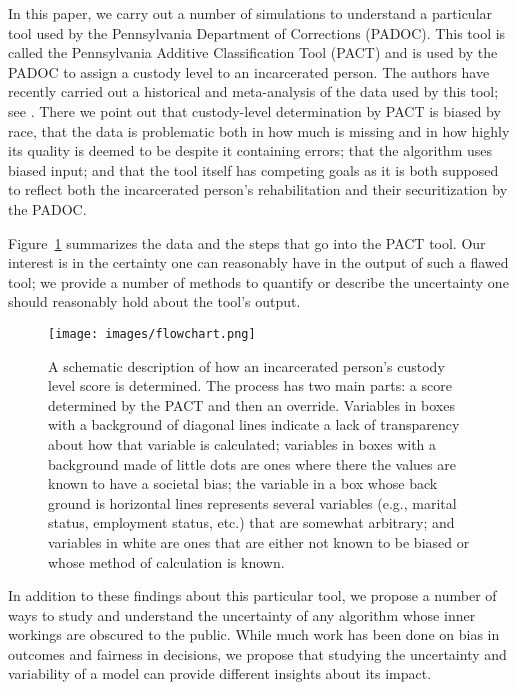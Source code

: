 \documentclass{amsproc}
\numberwithin{equation}{section}
\theoremstyle{plain}
\theoremstyle{remark}
\begin{document}
  
In this paper, we carry out a number of simulations to understand a particular tool used by the Pennsylvania Department of Corrections (PADOC).  This tool is called the Pennsylvania Additive Classification Tool (PACT) and is used by the PADOC to assign a custody level to an incarcerated person.  The authors have recently carried out a historical and meta-analysis of the data used by this tool; see \cite{dmmr1}.  There we point out that custody-level determination by PACT is biased by race, that the data is problematic both in how much is missing and in how highly its quality is deemed to be despite it containing errors; that the algorithm uses biased input;  and that the tool itself has competing goals as it is both supposed to reflect both the incarcerated person's rehabilitation and their securitization by the PADOC.  

 

Figure~\ref{fig:flowchart} summarizes the data and the steps that go into the PACT tool.  Our interest is in the certainty one can reasonably have in the output of such a flawed tool; we provide a number of methods to quantify or describe the uncertainty one should reasonably hold about the tool's output.  

\begin{figure}
\centering
\texttt{[image: images/flowchart.png]}
\caption{A schematic description of how an incarcerated person's custody level score is determined.  The process has two main parts:  a score determined by the PACT and then an override.  Variables in boxes with a background of diagonal lines indicate a lack of transparency about how that variable is calculated; variables in boxes with a background made of little dots are ones where there the values are known to have a societal bias; the variable in a box whose back ground is horizontal lines represents several variables (e.g., marital status, employment status, etc.) that are somewhat arbitrary; and variables in white are ones that are either not known to be biased or whose method of calculation is known. }\label{fig:flowchart}
\end{figure}


In addition to these findings about this particular tool, we propose a number of ways to study and understand the uncertainty of any algorithm whose inner workings are obscured to the public.  While much work has been done on bias in outcomes and fairness in decisions, we propose that studying the uncertainty and variability of a model can provide different insights about its impact.
\end{document}
